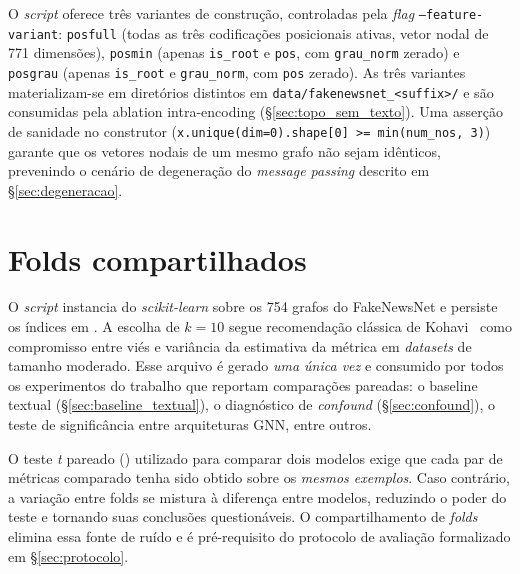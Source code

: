 O \emph{script} oferece tr\^es variantes de constru\c{c}\~ao, controladas
pela \emph{flag} \texttt{--feature-variant}: \texttt{posfull} (todas as
tr\^es codifica\c{c}\~oes posicionais ativas, vetor nodal de 771
dimens\~oes), \texttt{posmin} (apenas \texttt{is\_root} e \texttt{pos}, com
\texttt{grau\_norm} zerado) e \texttt{posgrau} (apenas \texttt{is\_root} e
\texttt{grau\_norm}, com \texttt{pos} zerado). As tr\^es variantes
materializam-se em diret\'orios distintos em
\texttt{data/fakenewsnet\_<suffix>/} e s\~ao consumidas pela ablation
intra-encoding (\S\ref{sec:topo_sem_texto}). Uma asser\c{c}\~ao de sanidade
no construtor (\texttt{x.unique(dim=0).shape[0] >= min(num\_nos, 3)})
garante que os vetores nodais de um mesmo grafo n\~ao sejam id\^enticos,
prevenindo o cen\'ario de degenera\c{c}\~ao do \emph{message passing}
descrito em \S\ref{sec:degeneracao}.

\section{Folds compartilhados}
\label{sec:folds}

O \emph{script}  instancia
 do
\emph{scikit-learn} sobre os 754 grafos do FakeNewsNet e persiste os
\'indices em . A escolha de $k=10$ segue
recomenda\c{c}\~ao cl\'assica de Kohavi~\cite{kohavi1995cv} como
compromisso entre vi\'es e vari\^ancia da estimativa da m\'etrica em
\emph{datasets} de tamanho moderado. Esse arquivo \'e gerado
\emph{uma \'unica vez} e consumido por todos os experimentos do trabalho
que reportam compara\c{c}\~oes pareadas: o baseline textual
(\S\ref{sec:baseline_textual}), o diagn\'ostico de \emph{confound}
(\S\ref{sec:confound}), o teste de signific\^ancia entre arquiteturas
GNN, entre outros.

O teste \emph{t} pareado
() utilizado para comparar dois modelos
exige que cada par de m\'etricas comparado tenha sido obtido sobre os
\emph{mesmos exemplos}. Caso contr\'ario, a varia\c{c}\~ao entre folds se
mistura \`a diferen\c{c}a entre modelos, reduzindo o poder do teste e
tornando suas conclus\~oes question\'aveis. O compartilhamento de
\emph{folds} elimina essa fonte de ru\'ido e \'e pr\'e-requisito do
protocolo de avalia\c{c}\~ao formalizado em \S\ref{sec:protocolo}.

